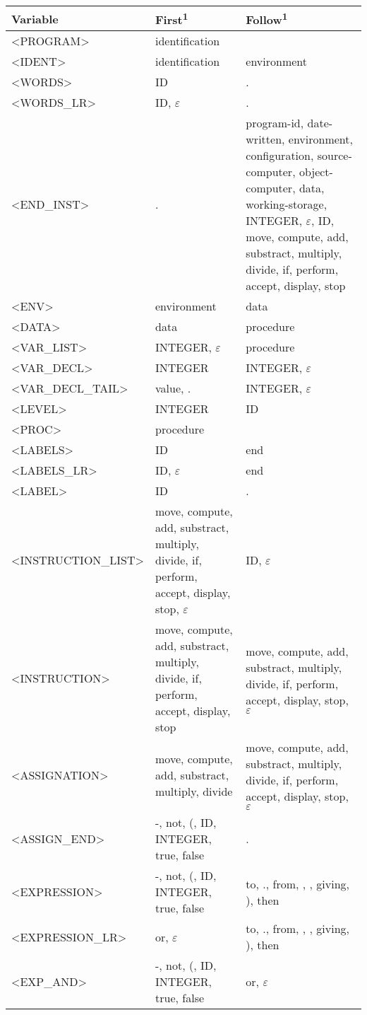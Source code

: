 \documentclass[a4paper,11pt]{article}
\begin{document}
\begin{longtable}{l>{\raggedright}p{6cm}p{6cm}}
	Variable & First\textsuperscript{1} & Follow\textsuperscript{1} \\ \hline
	<PROGRAM> & identification & \\
	<IDENT> & identification & environment\\
	<WORDS> & ID & .\\
	<WORDS\_LR> & ID, $\varepsilon$ & .\\
	<END\_INST> & . & program-id, date-written, environment, configuration, source-computer, object-computer, data, working-storage, INTEGER, $\varepsilon$, ID, move, compute, add, substract, multiply, divide, if, perform, accept, display, stop\\
	<ENV> & environment & data\\
	<DATA> & data & procedure\\
	<VAR\_LIST> & INTEGER, $\varepsilon$ & procedure \\
	<VAR\_DECL> & INTEGER & INTEGER, $\varepsilon$ \\
	<VAR\_DECL\_TAIL> & value, . & INTEGER, $\varepsilon$ \\
	<LEVEL> & INTEGER & ID\\
	<PROC> & procedure & \\
	<LABELS> & ID & end\\
	<LABELS\_LR> & ID, $\varepsilon$ & end\\
	<LABEL> & ID & .\\
	<INSTRUCTION\_LIST> & move, compute, add, substract, multiply, divide, if, perform, accept, display, stop, $\varepsilon$ & ID, $\varepsilon$\\
	<INSTRUCTION> & move, compute, add, substract, multiply, divide, if, perform, accept, display, stop &  move, compute, add, substract, multiply, divide, if, perform, accept, display, stop, $\varepsilon$ \\
	<ASSIGNATION> & move, compute, add, substract, multiply, divide & move, compute, add, substract, multiply, divide, if, perform, accept, display, stop, $\varepsilon$ \\
	<ASSIGN\_END> & -, not, (, ID, INTEGER, true, false & .\\
	<EXPRESSION> & -, not, (, ID, INTEGER, true, false & to, ., from, , , giving, ), then\\
	<EXPRESSION\_LR> & or, $\varepsilon$ & to, ., from, , , giving, ), then\\
	<EXP\_AND> & -, not, (, ID, INTEGER, true, false & or, $\varepsilon$ \\

\end{longtable}
\end{document}
